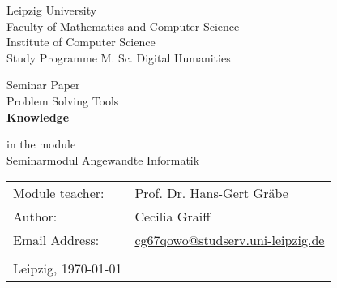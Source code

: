 \begin{titlepage}

	\sffamily
    \large
	\begin{flushleft}
	   \doublespacing
	    Leipzig University 				   \\
	    Faculty of Mathematics and Computer Science \\
	    Institute of Computer Science				   \\
	    Study Programme M. Sc. Digital Humanities \\
	\end{flushleft}
	
	\begin{center}
        \vspace{4cm}	
		\large
		Seminar Paper \\
		
		\Huge
		Problem Solving Tools \\
        \textbf{Knowledge}\\
      
        
        \vspace{5mm}
        
        \large
		in the module \\
        Seminarmodul Angewandte Informatik
	\end{center}
	
	\vfill

    \renewcommand{\arraystretch}{1.5}
	\begin{tabular}{ll}
	        Module teacher:     & Prof. Dr. Hans-Gert Gräbe \\
			Author: 	& Cecilia Graiff \\
			Email Address: & \multicolumn{1}{p{7cm}}{ 
			\href{mailto:cg67qowo@studserv.uni-leipzig.de}{cg67qowo@studserv.uni-leipzig.de}
			} \\
			& \\
			Leipzig, \today
	\end{tabular}
	
\end{titlepage} 